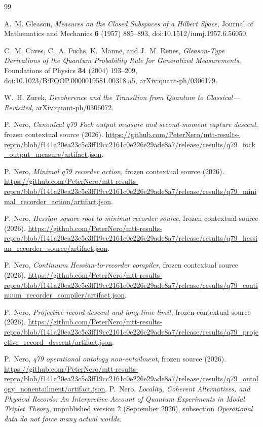 \documentclass[11pt]{article}
\begin{document}
\begin{thebibliography}{99}
\raggedright

A.~M. Gleason,
\emph{Measures on the Closed Subspaces of a Hilbert Space},
Journal of Mathematics and Mechanics \textbf{6} (1957) 885--893,
doi:10.1512/iumj.1957.6.56050.

C.~M. Caves, C.~A. Fuchs, K.~Manne, and J.~M. Renes,
\emph{Gleason-Type Derivations of the Quantum Probability Rule for
Generalized Measurements},
Foundations of Physics \textbf{34} (2004) 193--209,
doi:10.1023/B:FOOP.0000019581.00318.a5,
arXiv:quant-ph/0306179.

W.~H. Zurek,
\emph{Decoherence and the Transition from Quantum to Classical---Revisited},
arXiv:quant-ph/0306072.

P.~Nero, \emph{Canonical q79 Fock output measure and second-moment capture descent}, frozen contextual source (2026).
\url{https://github.com/PeterNero/mtt-results-repro/blob/f141a20ea23c5c3ff19cc2161c0e226e29ade8a7/release/results/q79_fock_output_measure/artifact.json}.

P.~Nero, \emph{Minimal q79 recorder action}, frozen contextual source (2026).
\url{https://github.com/PeterNero/mtt-results-repro/blob/f141a20ea23c5c3ff19cc2161c0e226e29ade8a7/release/results/q79_minimal_recorder_action/artifact.json}.

P.~Nero, \emph{Hessian square-root to minimal recorder source}, frozen contextual source (2026).
\url{https://github.com/PeterNero/mtt-results-repro/blob/f141a20ea23c5c3ff19cc2161c0e226e29ade8a7/release/results/q79_hessian_recorder_source/artifact.json}.

P.~Nero, \emph{Continuum Hessian-to-recorder compiler}, frozen contextual source (2026).
\url{https://github.com/PeterNero/mtt-results-repro/blob/f141a20ea23c5c3ff19cc2161c0e226e29ade8a7/release/results/q79_continuum_recorder_compiler/artifact.json}.

P.~Nero, \emph{Projective record descent and long-time limit}, frozen contextual source (2026).
\url{https://github.com/PeterNero/mtt-results-repro/blob/f141a20ea23c5c3ff19cc2161c0e226e29ade8a7/release/results/q79_projective_record_descent/artifact.json}.

P.~Nero, \emph{q79 operational ontology non-entailment}, frozen source (2026).
\url{https://github.com/PeterNero/mtt-results-repro/blob/f141a20ea23c5c3ff19cc2161c0e226e29ade8a7/release/results/q79_ontology_nonentailment/artifact.json}.
P.~Nero, \emph{Locality, Coherent Alternatives, and Physical Records:
An Interpretive Account of Quantum Experiments in Modal Triplet Theory},
unpublished version 2 (September 2026), subsection \emph{Operational data do not
force many actual worlds}.

\end{thebibliography}
\end{document}
